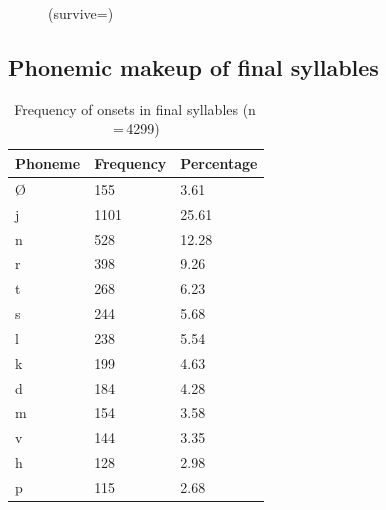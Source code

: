 \begin{figure}[h]
\pex\label{ex:tgcoda}
	\a\label{ex:pangitlan}%
	\a {} (survive=\TplN{})
\xe
\end{figure}

\subsection{Phonemic makeup of final syllables}
\label{subsec:finsyl}
%

\begin{table}\centering
\caption[Frequency of onsets in final syllables]{Frequency of onsets in final 
syllables (n\,=\,4299)}
\setlength{\multicolsep}{0em}
\begin{multicols}{2}
\begin{tabu} to \linewidth{X X[c] X[c]}
\tableheaderfont\toprule
Phoneme
	& Frequency
	& Percentage
	\\
	
\toprule

Ø
	& 155
	& 3.61\pct
	\\

\midrule

j
	& 1101
	& 25.61\pct
	\\

n
	& 528
	& 12.28\pct
	\\

r
	& 398
	& 9.26\pct
	\\

t
	& 268
	& 6.23\pct
	\\

s
	& 244
	& 5.68\pct
	\\

l
	& 238
	& 5.54\pct
	\\

k
	& 199
	& 4.63\pct
	\\

d
	& 184
	& 4.28\pct
	\\

m
	& 154
	& 3.58\pct
	\\

v
	& 144
	& 3.35\pct
	\\

h
	& 128
	& 2.98\pct
	\\

p
	& 115
	& 2.68\pct
	\\


\end{tabu}
\end{multicols}
\end{table}

